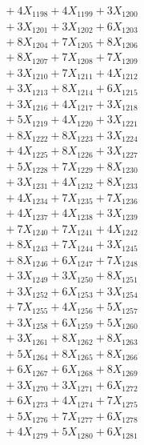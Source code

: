 \documentclass[a4paper,10pt]{article}
\begin{document}
{\begin{align}
&\;  + 4 X_{1198} + 4 X_{1199} + 3 X_{1200} \\[0.3ex]
&\;  + 3 X_{1201} + 3 X_{1202} + 6 X_{1203} \\[0.3ex]
&\;  + 8 X_{1204} + 7 X_{1205} + 8 X_{1206} \\[0.3ex]
&\;  + 8 X_{1207} + 7 X_{1208} + 7 X_{1209} \\[0.5ex]\allowbreak
&\;  + 3 X_{1210} + 7 X_{1211} + 4 X_{1212} \\[0.3ex]
&\;  + 3 X_{1213} + 8 X_{1214} + 6 X_{1215} \\[0.3ex]
&\;  + 3 X_{1216} + 4 X_{1217} + 3 X_{1218} \\[0.3ex]
&\;  + 5 X_{1219} + 4 X_{1220} + 3 X_{1221} \\[0.3ex]
&\;  + 8 X_{1222} + 8 X_{1223} + 3 X_{1224} \\[0.3ex]
&\;  + 4 X_{1225} + 8 X_{1226} + 3 X_{1227} \\[0.3ex]
&\;  + 5 X_{1228} + 7 X_{1229} + 8 X_{1230} \\[0.3ex]
&\;  + 3 X_{1231} + 4 X_{1232} + 8 X_{1233} \\[0.3ex]
&\;  + 4 X_{1234} + 7 X_{1235} + 7 X_{1236} \\[0.3ex]
&\;  + 4 X_{1237} + 4 X_{1238} + 3 X_{1239} \\[0.5ex]\allowbreak
&\;  + 7 X_{1240} + 7 X_{1241} + 4 X_{1242} \\[0.3ex]
&\;  + 8 X_{1243} + 7 X_{1244} + 3 X_{1245} \\[0.3ex]
&\;  + 8 X_{1246} + 6 X_{1247} + 7 X_{1248} \\[0.3ex]
&\;  + 3 X_{1249} + 3 X_{1250} + 8 X_{1251} \\[0.3ex]
&\;  + 3 X_{1252} + 6 X_{1253} + 3 X_{1254} \\[0.3ex]
&\;  + 7 X_{1255} + 4 X_{1256} + 5 X_{1257} \\[0.3ex]
&\;  + 3 X_{1258} + 6 X_{1259} + 5 X_{1260} \\[0.3ex]
&\;  + 3 X_{1261} + 8 X_{1262} + 8 X_{1263} \\[0.3ex]
&\;  + 5 X_{1264} + 8 X_{1265} + 8 X_{1266} \\[0.3ex]
&\;  + 6 X_{1267} + 6 X_{1268} + 8 X_{1269} \\[0.5ex]\allowbreak
&\;  + 3 X_{1270} + 3 X_{1271} + 6 X_{1272} \\[0.3ex]
&\;  + 6 X_{1273} + 4 X_{1274} + 7 X_{1275} \\[0.3ex]
&\;  + 5 X_{1276} + 7 X_{1277} + 6 X_{1278} \\[0.3ex]
&\;  + 4 X_{1279} + 5 X_{1280} + 6 X_{1281} \\[0.3ex]

\end{align}}
\end{document}
